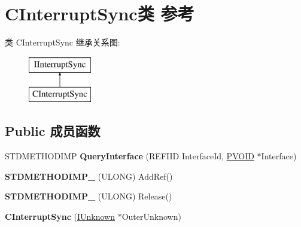 \hypertarget{class_c_interrupt_sync}{}\section{C\+Interrupt\+Sync类 参考}
\label{class_c_interrupt_sync}
类 C\+Interrupt\+Sync 继承关系图\+:\begin{figure}[H]
\begin{center}
\leavevmode
\includegraphics[height=2.000000cm]{class_c_interrupt_sync}
\end{center}
\end{figure}
\subsection*{Public 成员函数}
\begin{DoxyCompactItemize}
\item 
\mbox{\label{class_c_interrupt_sync_aff6a59fb2917717c3bd1d1f57a1d99d9}} 
S\+T\+D\+M\+E\+T\+H\+O\+D\+I\+MP {\bfseries Query\+Interface} (R\+E\+F\+I\+ID Interface\+Id, \hyperlink{interfacevoid}{P\+V\+O\+ID} $\ast$Interface)
\item 
\mbox{\label{class_c_interrupt_sync_a11607ebb50937abb599c40c17c055c45}} 
{\bfseries S\+T\+D\+M\+E\+T\+H\+O\+D\+I\+M\+P\+\_\+} (U\+L\+O\+NG) Add\+Ref()
\item 
\mbox{\label{class_c_interrupt_sync_ac1cb89e3beae547dcb9ca3134728a631}} 
{\bfseries S\+T\+D\+M\+E\+T\+H\+O\+D\+I\+M\+P\+\_\+} (U\+L\+O\+NG) Release()
\item 
\mbox{\label{class_c_interrupt_sync_a72df259fa54655bd8ad3c61a76d27265}} 
{\bfseries C\+Interrupt\+Sync} (\hyperlink{interface_i_unknown}{I\+Unknown} $\ast$Outer\+Unknown)
\end{DoxyCompactItemize}

